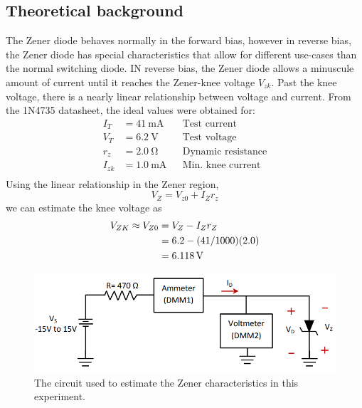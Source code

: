 \documentclass{report}
\begin{document}
\subsection{Theoretical background}
The Zener diode behaves normally in the forward bias, however in reverse bias, the Zener diode has special characteristics that allow for different use-cases than the normal switching diode. IN reverse bias, the Zener diode allows a minuscule amount of current until it reaches the Zener-knee voltage $V_{zk}$. Past the knee voltage, there is a nearly linear relationship between voltage and current. From the 1N4735 datasheet, the ideal values were obtained for: \begin{align*}
	I_T & = \SI{41}{\mA} && \text{Test current} \\
	V_T & = \SI{6.2}{\V} && \text{Test voltage} \\
	r_z & = \SI{2.0}{\ohm} && \text{Dynamic resistance} \\
	I_{zk} & = \SI{1.0}{\mA} && \text{Min. knee current}\\
\end{align*}
Using the linear relationship in the Zener region, \begin{equation}
	V_Z = V_{z0} + I_Z r_z \label{eq:exp3vz}
\end{equation}
we can estimate the knee voltage as \begin{align}
	V_{ZK} \approx V_{Z0} & = V_Z - I_Z r_Z \notag \\
		& = 6.2 - (41 / 1000)(2.0) \notag \\
		& = \SI{6.118}{\V} \notag
\end{align}

\begin{figure}[H]
	\centering
	\includegraphics[width=0.7\linewidth]{exp2ckt}
	\caption{The circuit used to estimate the Zener characteristics in this experiment.}
	\label{fig:exp2ckt}
\end{figure}
\end{document}
